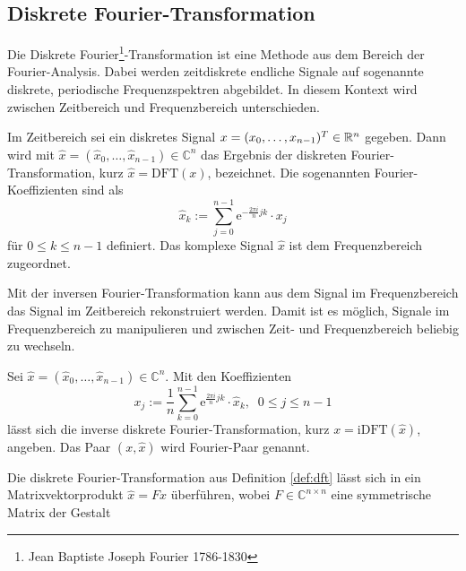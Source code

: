 

\subsection{Diskrete Fourier-Transformation}
\label{abs:dft}
Die Diskrete Fourier\footnote{Jean Baptiste Joseph Fourier 1786-1830}-Transformation ist eine Methode aus dem Bereich der Fourier-Analysis. Dabei werden zeitdiskrete endliche Signale auf sogenannte diskrete, periodische Frequenzspektren abgebildet. In diesem Kontext wird zwischen Zeitbereich und Frequenzbereich unterschieden.

\begin{defi}
    \label{def:dft}
    Im Zeitbereich sei ein diskretes Signal $x=(x_0, \ldots, x_{n-1})^T \in \mathbb{R}^n$ gegeben. Dann wird mit $\hat{x}=(\hat{x}_0, \ldots, \hat{x}_{n-1}) \in \mathbb{C}^n$ das Ergebnis der diskreten Fourier-Transformation, kurz $\hat{x}=\mathrm{DFT}(x)$, bezeichnet. Die sogenannten Fourier-Koeffizienten sind als 
    \begin{equation*}
        \hat{x}_k:=\sum_{j=0}^{n-1} \mathrm{e}^{- \frac{2 \pi i}{n} j k} \cdot x_j
    \end{equation*}
    für $0 \leq k \leq n-1$ definiert. Das komplexe Signal $\hat{x}$ ist dem Frequenzbereich zugeordnet.
\end{defi}
Mit der inversen Fourier-Transformation kann aus dem Signal im Frequenzbereich das Signal im Zeitbereich rekonstruiert werden. Damit ist es möglich, Signale im Frequenzbereich zu manipulieren und zwischen Zeit- und Frequenzbereich beliebig zu wechseln.
\begin{defi}
    Sei $\hat{x}=(\hat{x}_0, \ldots, \hat{x}_{n-1}) \in \mathbb{C}^n$. Mit den Koeffizienten
    \begin{equation*}
        x_j:= \frac{1}{n} \sum_{k=0}^{n-1} \mathrm{e}^{\frac{2 \pi i}{n} j k} \cdot \hat{x}_k, \; \; 0 \leq j \leq n-1
    \end{equation*}
    lässt sich die inverse diskrete Fourier-Transformation, kurz $x=\mathrm{iDFT}(\hat{x})$, angeben. Das Paar $(x ,\hat{x})$ wird Fourier-Paar genannt.
\end{defi}
Die diskrete Fourier-Transformation aus Definition \ref{def:dft} lässt sich in ein Matrixvektorprodukt $\hat{x}=Fx$ überführen, wobei $F \in \mathbb{C}^{n \times n}$ eine symmetrische Matrix der Gestalt
